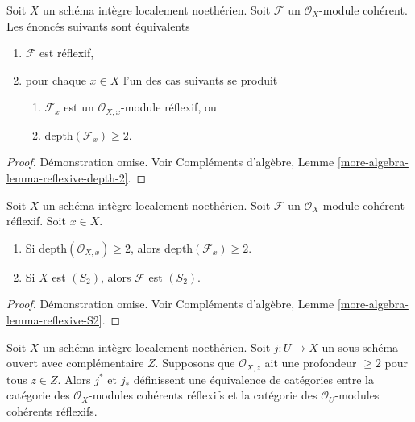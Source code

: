 \begin{lemma}
\label{lemma-reflexive-depth-2}
Soit  $X$  un schéma intègre localement noethérien. Soit  $\mathcal{F}$  un
 $\mathcal{O}_X$-module cohérent. Les énoncés suivants sont équivalents
\begin{enumerate}
\item $\mathcal{F}$  est réflexif,
\item pour chaque  $x \in X$  l'un des cas suivants se produit
\begin{enumerate}
\item $\mathcal{F}_x$  est un  $\mathcal{O}_{X, x}$-module réflexif, ou
\item $\text{depth}(\mathcal{F}_x) \geq 2$.
\end{enumerate}
\end{enumerate}
\end{lemma}

\begin{proof}
Démonstration omise. Voir Compléments d'algèbre, Lemme  \ref{more-algebra-lemma-reflexive-depth-2}.
\end{proof}

\begin{lemma}
\label{lemma-reflexive-S2}
Soit  $X$  un schéma intègre localement noethérien. Soit  $\mathcal{F}$  un
 $\mathcal{O}_X$-module cohérent réflexif. Soit  $x \in X$.
\begin{enumerate}
\item Si  $\text{depth}(\mathcal{O}_{X, x}) \geq 2$, alors  $\text{depth}(\mathcal{F}_x) \geq 2$.
\item Si  $X$  est  $(S_2)$, alors  $\mathcal{F}$  est  $(S_2)$.
\end{enumerate}
\end{lemma}

\begin{proof}
Démonstration omise. Voir Compléments d'algèbre, Lemme  \ref{more-algebra-lemma-reflexive-S2}.
\end{proof}

\begin{lemma}
\label{lemma-reflexive-S2-extend}
Soit  $X$  un schéma intègre localement noethérien. Soit  $j : U \to X$  un
sous-schéma ouvert avec complémentaire  $Z$. Supposons que  $\mathcal{O}_{X, z}$ 
ait une profondeur  $\geq 2$  pour tous  $z \in Z$. Alors  $j^*$  et
 $j_*$  définissent une équivalence de catégories entre la catégorie des
 $\mathcal{O}_X$-modules cohérents réflexifs et la catégorie des  $\mathcal{O}_U$-modules
cohérents réflexifs.
\end{lemma}

